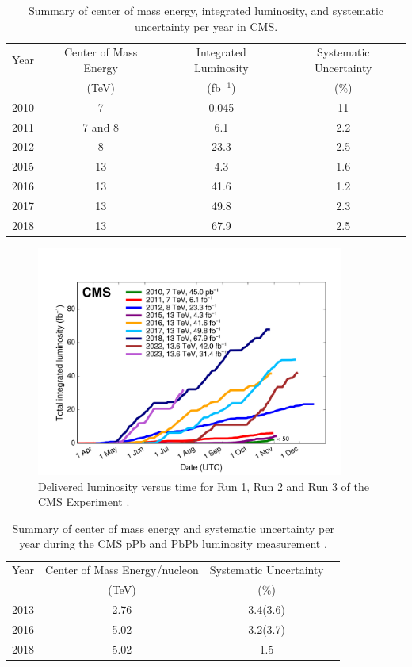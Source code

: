 \begin{table}[h]
  \centering
  \caption[Integrated luminosity and its precision per year]{Summary of center of mass energy, integrated luminosity, and systematic uncertainty per year in CMS.}
\begin{tabular}{c c c c}
  Year & Center of Mass Energy & Integrated Luminosity & Systematic Uncertainty \\
  & (TeV) & (fb$^{-1}$) & (\%) \\
\hline
2010 & 7 & 0.045 & 11 \\
2011 & 7 and 8 & 6.1 & 2.2 \\
2012 & 8 & 23.3 & 2.5 \\
2015 & 13 & 4.3 & 1.6 \\
2016 & 13 & 41.6 & 1.2 \\
2017 & 13 & 49.8 & 2.3 \\
2018 & 13 & 67.9 &  2.5\\
\end{tabular}
\label{tab:lumi}
\end{table}


\begin{figure}[!htp]
\centering
\includegraphics[width=0.9\textwidth]{ashish_thesis/CMS_luminosity.png}
\caption[CMS integrated luminosity]{%
    Delivered luminosity versus time for Run 1, Run 2 and Run 3 of the CMS Experiment \cite{wikicern_cc}.
}
\label{fig:lumi}
\end{figure}


\begin{table}[h]
  \centering
  \caption[Precision for pPb and PbPb collisions]{Summary of center of mass energy and systematic uncertainty per year during the CMS pPb and PbPb luminosity measurement \cite{CMS-PAS-LUM-13-002, CMS-PAS-LUM-17-002, CMS-PAS-LUM-18-001}.}
\begin{tabular}{c c c c}
  Year & Center of Mass Energy/nucleon & Systematic Uncertainty \\
  & (TeV) & (\%) \\
\hline
2013 & 2.76 & 3.4(3.6)  \\
2016 &  5.02  & 3.2(3.7)\\
2018 & 5.02 & 1.5 \\
\end{tabular}
\label{tab:lumi40}
\end{table}

